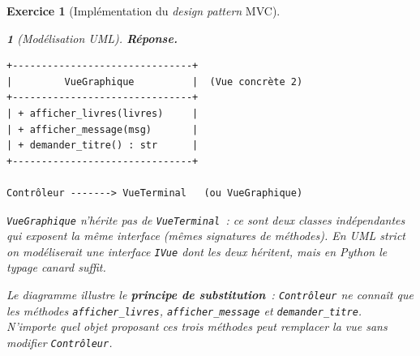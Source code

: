 \documentclass{article}
\theoremstyle{exostyle}
\newtheorem{exo}{Exercice}
\theoremstyle{partiestyle}
\newtheorem{partie}{}[exo]
\theoremstyle{questionstyle}
\newenvironment{reponse}{%
    \par\smallskip\noindent\textbf{Réponse.}\enspace\ignorespaces
}{%
    \par\smallskip
}
\begin{document}
\begin{exo}[Implémentation du \textit{design pattern} MVC]
\begin{partie}[Modélisation UML]
\begin{reponse}
\begin{verbatim}
+-------------------------------+
|         VueGraphique          |  (Vue concrète 2)
+-------------------------------+
| + afficher_livres(livres)     |
| + afficher_message(msg)       |
| + demander_titre() : str      |
+-------------------------------+

Contrôleur -------> VueTerminal   (ou VueGraphique)
\end{verbatim}
            \texttt{VueGraphique} n'hérite pas de \texttt{VueTerminal}~: ce sont deux classes indépendantes qui exposent la même \textit{interface} (mêmes signatures de méthodes). En UML strict on modéliserait une interface \texttt{IVue} dont les deux héritent, mais en Python le typage canard suffit.

            Le diagramme illustre le \textbf{principe de substitution}~: \texttt{Contrôleur} ne connaît que les méthodes \texttt{afficher\_livres}, \texttt{afficher\_message} et \texttt{demander\_titre}. N'importe quel objet proposant ces trois méthodes peut remplacer la vue sans modifier \texttt{Contrôleur}.
        \end{reponse}

    \end{partie}
\end{exo}
\end{document}
